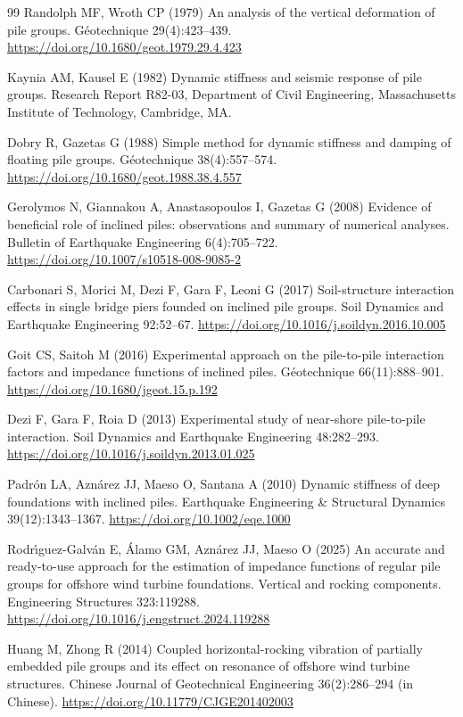 \documentclass[11pt]{article}
\begin{document}
\begin{thebibliography}{99}
Randolph MF, Wroth CP (1979) An analysis of the vertical deformation of pile groups. G{\'e}otechnique 29(4):423--439. \url{https://doi.org/10.1680/geot.1979.29.4.423}

Kaynia AM, Kausel E (1982) Dynamic stiffness and seismic response of pile groups. Research Report R82-03, Department of Civil Engineering, Massachusetts Institute of Technology, Cambridge, MA.

Dobry R, Gazetas G (1988) Simple method for dynamic stiffness and damping of floating pile groups. G{\'e}otechnique 38(4):557--574. \url{https://doi.org/10.1680/geot.1988.38.4.557}

Gerolymos N, Giannakou A, Anastasopoulos I, Gazetas G (2008) Evidence of beneficial role of inclined piles: observations and summary of numerical analyses. Bulletin of Earthquake Engineering 6(4):705--722. \url{https://doi.org/10.1007/s10518-008-9085-2}

Carbonari S, Morici M, Dezi F, Gara F, Leoni G (2017) Soil-structure interaction effects in single bridge piers founded on inclined pile groups. Soil Dynamics and Earthquake Engineering 92:52--67. \url{https://doi.org/10.1016/j.soildyn.2016.10.005}

Goit CS, Saitoh M (2016) Experimental approach on the pile-to-pile interaction factors and impedance functions of inclined piles. G{\'e}otechnique 66(11):888--901. \url{https://doi.org/10.1680/jgeot.15.p.192}

Dezi F, Gara F, Roia D (2013) Experimental study of near-shore pile-to-pile interaction. Soil Dynamics and Earthquake Engineering 48:282--293. \url{https://doi.org/10.1016/j.soildyn.2013.01.025}

Padr{\'o}n LA, Azn{\'a}rez JJ, Maeso O, Santana A (2010) Dynamic stiffness of deep foundations with inclined piles. Earthquake Engineering \& Structural Dynamics 39(12):1343--1367. \url{https://doi.org/10.1002/eqe.1000}

Rodr{\'\i}guez-Galv{\'a}n E, {\'A}lamo GM, Azn{\'a}rez JJ, Maeso O (2025) An accurate and ready-to-use approach for the estimation of impedance functions of regular pile groups for offshore wind turbine foundations. Vertical and rocking components. Engineering Structures 323:119288. \url{https://doi.org/10.1016/j.engstruct.2024.119288}

Huang M, Zhong R (2014) Coupled horizontal-rocking vibration of partially embedded pile groups and its effect on resonance of offshore wind turbine structures. Chinese Journal of Geotechnical Engineering 36(2):286--294 (in Chinese). \url{https://doi.org/10.11779/CJGE201402003}


\end{thebibliography}
\end{document}
